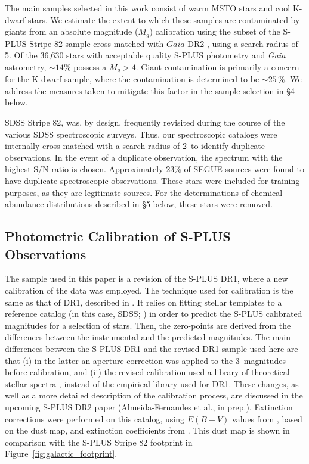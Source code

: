 \documentclass[twocolumn,trackchanges]{aastex63}
\begin{document}
The main samples selected in this work consist of warm MSTO stars and cool K-dwarf stars. We estimate the extent to which these samples are contaminated by giants from an absolute magnitude ($M_g$) calibration using the subset of the S-PLUS Stripe 82 sample cross-matched with $Gaia$ DR2 \citep{Gaia}, using a search radius of 5\arcsec. Of the 36,630 stars with acceptable quality S-PLUS photometry and \textit{Gaia} astrometry, $\sim 14\%$ possess a $M_g >4$. Giant contamination is primarily a concern for the K-dwarf sample, where the contamination is determined to be $\sim 25$\,\%. We address the measures taken to mitigate this factor in the sample selection in \S 4 below.

SDSS Stripe 82, was, by design, frequently revisited during the course of the various SDSS spectroscopic surveys. Thus, our spectroscopic catalogs were internally cross-matched with a search radius of 2\arcsec\ to identify duplicate observations. In the event of a duplicate observation, the spectrum with the highest S/N ratio is chosen. Approximately 23\% of SEGUE sources were found to have duplicate spectroscopic observations. These stars were included for training purposes, as they are legitimate sources. For the determinations of chemical-abundance distributions described in \S 5 below, these stars were removed.

\subsection{Photometric Calibration of S-PLUS Observations}

The sample used in this paper is a revision of the S-PLUS DR1, where a new calibration of the data was employed. The technique used for calibration is the same as that of DR1, described in \citet{Mendes:2019}.  It relies on fitting stellar templates to a reference catalog (in this case, SDSS; \citealt{Ivezic:2007}) in order to predict the S-PLUS calibrated magnitudes for a selection of stars. Then, the zero-points are derived from the differences between the instrumental and the predicted magnitudes. The main differences between the S-PLUS DR1 and the revised DR1 sample used here are that (i) in the latter an aperture correction was applied to the 3\arcsec\ magnitudes before calibration, and (ii) the revised calibration used a library of theoretical stellar spectra \citep{Coelho:2014}, instead of the empirical library used for DR1. These changes, as well as a more detailed description of the calibration process, are discussed in the upcoming S-PLUS DR2 paper (Almeida-Fernandes et al., in prep.). Extinction corrections were performed on this catalog, using $E(B-V)$ values from \citet{Schlafly:2011}, based on the \citet{Schlegel:1998} dust map, and extinction coefficients from \citet{LopezSanjuan:2019}. This dust map is shown in comparison with the S-PLUS Stripe 82 footprint in Figure~\ref{fig:galactic_footprint}.\\
\\
\end{document}
